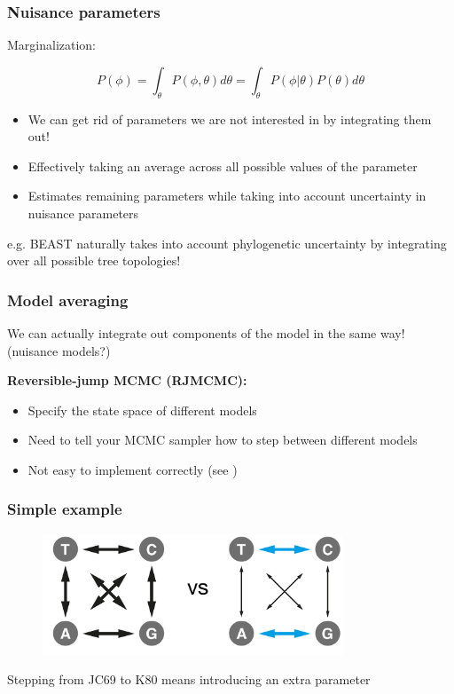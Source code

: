 \begin{frame}\frametitle{Nuisance parameters}

  Marginalization:

  \[
    P(\phi) = \int_\theta P(\phi,\theta)d\theta = \int_\theta P(\phi | \theta) P(\theta) d\theta
  \]

  \begin{itemize}
    \item We can get rid of parameters we are not interested in by integrating them out!
    \item Effectively taking an average across all possible values of the parameter
    \item Estimates remaining parameters while taking into account uncertainty in nuisance parameters
  \end{itemize}

  \pause
  e.g. BEAST naturally takes into account phylogenetic uncertainty by integrating over all possible tree topologies!

\end{frame}


\begin{frame}\frametitle{Model averaging}

  We can actually integrate out components of the model in the same way!
  (nuisance models?)

  \vspace{0.5cm}
  \textbf{Reversible-jump MCMC (RJMCMC):}

  \begin{itemize}
    \item Specify the state space of different models
    \item Need to tell your MCMC sampler how to step between different models
    \item Not easy to implement correctly (see \cite{Green1995})
  \end{itemize}
  
\end{frame}

\begin{frame}\frametitle{Simple example}

  \begin{figure}
      \includegraphics[width=0.8\textwidth]{figures/jc69vsk80.pdf}
  \end{figure}


  Stepping from JC69 to K80 means introducing an extra parameter

\end{frame}

